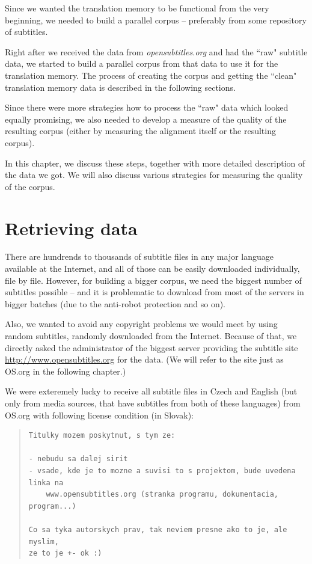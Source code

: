 \label{chap:building_corpus}

Since we wanted the translation memory to be functional from the very beginning, we needed to build a parallel corpus -- preferably from some repository of subtitles. 

Right after we received the data from \emph{opensubtitles.org} and had the ``raw" subtitle data, we started to build a parallel corpus from that data to use it for the translation memory. The process of creating the corpus and getting the ``clean" translation memory data is described in the following sections.

Since there were more strategies how to process the ``raw" data which looked equally promising, we also needed to develop a measure of the quality of the resulting corpus (either by measuring the alignment itself or the resulting corpus).

In this chapter, we discuss these steps, together with more detailed description of the data we got. We will also discuss various strategies for measuring the quality of the corpus.

\section{Retrieving data}

There are hundrends to thousands of subtitle files in any major language available at the Internet, and all of those can be easily downloaded individually, file by file. However, for building a bigger corpus, we need the biggest number of subtitles possible -- and it is problematic to download from most of the servers in bigger batches (due to the anti-robot protection and so on). 

Also, we wanted to avoid any copyright problems we would meet by using random subtitles, randomly downloaded from the Internet. Because of that, we directly asked the administrator of the biggest server providing the subtitle site \url{http://www.opensubtitles.org} for the data. (We will refer to the site just as OS.org in the following chapter.)

We were exteremely lucky to receive all subtitle files in Czech and English (but only from media sources, that have subtitles from both of these languages) from OS.org with following license condition (in Slovak):

\begin{quote}
\begin{verbatim}
Titulky mozem poskytnut, s tym ze:

- nebudu sa dalej sirit
- vsade, kde je to mozne a suvisi to s projektom, bude uvedena linka na
    www.opensubtitles.org (stranka programu, dokumentacia, program...)

Co sa tyka autorskych prav, tak neviem presne ako to je, ale myslim,
ze to je +- ok :)
\end{verbatim}
\end{quote}

